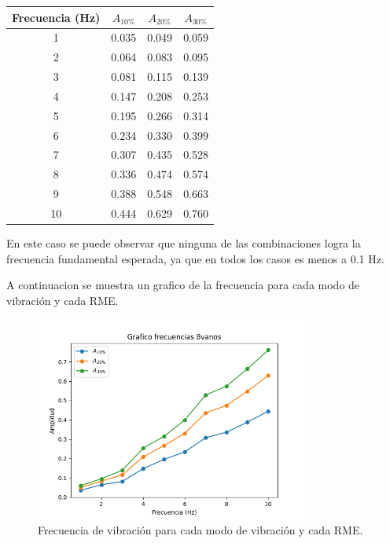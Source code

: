\begin{table}[H]
    \centering
    \begin{tabular}{cccc}
    \toprule
     Frecuencia (Hz) & $A_{10\%}$ & $A_{20\%}$ & $A_{30\%}$ \\
    \midrule
     1 &       0.035 &       0.049 &       0.059 \\
     2 &       0.064 &       0.083 &       0.095 \\
     3 &       0.081 &       0.115 &       0.139 \\
     4 &       0.147 &       0.208 &       0.253 \\
     5 &       0.195 &       0.266 &       0.314 \\
     6 &       0.234 &       0.330 &       0.399 \\
     7 &       0.307 &       0.435 &       0.528 \\
     8 &       0.336 &       0.474 &       0.574 \\
     9 &       0.388 &       0.548 &       0.663 \\
     10 &       0.444 &       0.629 &       0.760 \\
    \bottomrule
    \end{tabular}
\end{table}

En este caso se puede observar que ninguna de las combinaciones logra la frecuencia fundamental esperada, ya que en todos los casos es menos a 0.1 Hz.

A continuacion se muestra un grafico de la frecuencia para cada modo de vibración y cada RME. 

\begin{figure}[H]
    \centering
    \includegraphics[width=0.8\textwidth]{../grafico_frecuencias_8vanos.png}
    \caption{Frecuencia de vibración para cada modo de vibración y cada RME.}
\end{figure}

